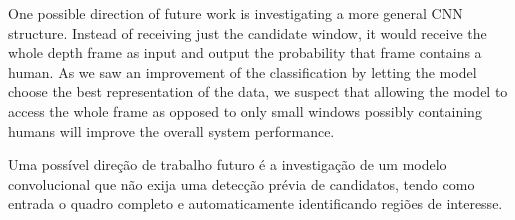     One possible direction of future work is investigating a more general CNN structure. Instead of receiving just the candidate window, it would receive the whole depth frame as input and output the probability that frame contains a human. As we saw an improvement of the classification by letting the model choose the best representation of the data, we suspect that allowing the model to access the whole frame as opposed to only small windows possibly containing humans will improve the overall system performance.

    Uma possível direção de trabalho futuro é a investigação de um modelo convolucional que não exija uma detecção prévia de candidatos, tendo como entrada o quadro completo e automaticamente identificando regiões de interesse.
